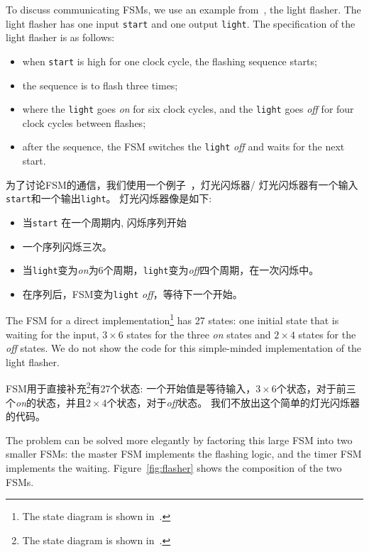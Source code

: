 \documentclass[%
    10pt,
    headinclude, footexclude,
    openright, %
    notitlepage,
    cleardoubleempty,
    headsepline,
    pointlessnumbers,
    bibtotoc, idxtotoc,
    ]{scrbook}
\newcommand{\code}[1]{{\small{\texttt{#1}}}}
\begin{document}
To discuss communicating FSMs, we use an example
from~\cite[Chapter~17]{dally:vhdl:2016}, the light flasher.
The light flasher has one input \code{start} and one output
\code{light}. The specification of the light flasher is as follows:
\begin{itemize}
\item when \code{start} is high for one clock cycle, the flashing
sequence starts;
\item the sequence is to flash three times;
\item where the \code{light} goes \emph{on} for six clock cycles, and the \code{light} goes \emph{off} for four clock cycles between flashes;
\item after the sequence, the FSM switches the \code{light} \emph{off} and waits
for the next start.
\end{itemize}

为了讨论FSM的通信，我们使用一个例子~\cite[Chapter~17]{dally:vhdl:2016}，灯光闪烁器/
灯光闪烁器有一个输入\code{start}和一个输出\code{light}。
灯光闪烁器像是如下:
\begin{itemize}
\item 当\code{start} 在一个周期内, 闪烁序列开始
\item 一个序列闪烁三次。
\item 当\code{light}变为\emph{on}为6个周期，\code{light}变为\emph{off}四个周期，在一次闪烁中。
\item 在序列后，FSM变为\code{light} \emph{off}，等待下一个开始。
\end{itemize}


The FSM for a direct implementation\footnote{The state diagram is shown
in~\cite[p.~376]{dally:vhdl:2016}.} has 27 states:
one initial state that is waiting for the input, $3 \times 6$ states for the three
\emph{on} states and $2 \times 4$ states for the \emph{off} states.
We do not show the code for this simple-minded implementation of the light
flasher.

FSM用于直接补充\footnote{The state diagram is shown
in~\cite[p.~376]{dally:vhdl:2016}.}有27个状态:
一个开始值是等待输入，$3 \times 6$个状态，对于前三个\emph{on}的状态，并且$2 \times 4$个状态，对于\emph{off}状态。
我们不放出这个简单的灯光闪烁器的代码。

The problem can be solved more elegantly by factoring this large FSM into
two smaller FSMs: the master FSM implements the flashing logic, and the timer FSM
implements the waiting. Figure~\ref{fig:flasher} shows the composition of
the two FSMs.
\end{document}
